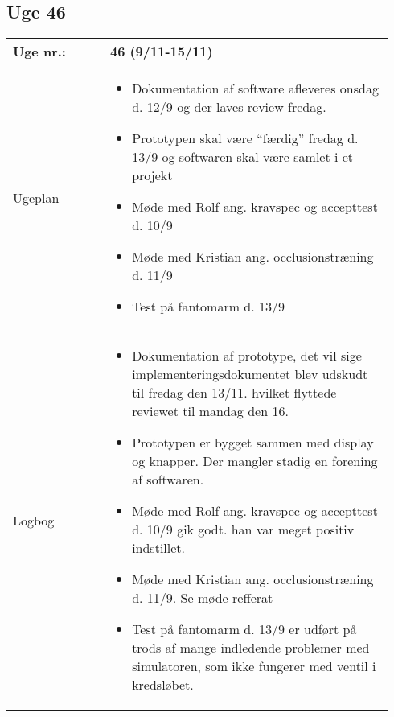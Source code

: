 	\subsection{Uge 46}
	\begin{longtable}{|p{0.24\linewidth}|p{0.7\linewidth}|}
		\hline
		Uge nr.: & 46 (9/11-15/11)\\ \hline
		Ugeplan & 
		\begin{itemize}
			\item Dokumentation af software afleveres onsdag d. 12/9 og der laves review fredag. 
			\item Prototypen skal være “færdig” fredag d. 13/9 og softwaren skal være samlet i et projekt
			\item Møde med Rolf ang. kravspec og accepttest d. 10/9 
			\item Møde med Kristian ang. occlusionstræning d. 11/9
			\item Test på fantomarm d. 13/9
		\end{itemize}
		
		\\ \hline
		Logbog & 
		\begin{itemize}
			\item Dokumentation af prototype, det vil sige implementeringsdokumentet blev udskudt til fredag den 13/11. hvilket flyttede reviewet til mandag den 16.
			\item Prototypen er bygget sammen med display og knapper. Der mangler stadig en forening af softwaren.
			\item Møde med Rolf ang. kravspec og accepttest d. 10/9 gik godt. han var meget positiv indstillet.
			\item Møde med Kristian ang. occlusionstræning d. 11/9. Se møde refferat
			\item Test på fantomarm d. 13/9 er udført på trods af mange indledende problemer med simulatoren, som ikke fungerer med ventil i kredsløbet.
		\end{itemize}
		\\ \hline
	\end{longtable}
	
